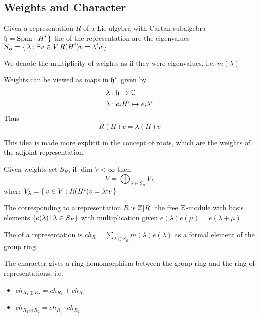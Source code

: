 \documentclass{article}
\begin{document}
\subsection{Weights and Character}
\begin{definition}[Weights]
	Given a representation $R$ of a Lie algebra with Cartan subalgebra $\mathfrak{h}=\operatorname{Span}\set{ H^i }$ the  of the representation are the eigenvalues $S_R=\set{ \lambda : \exists v\in V \, R(H^i)v=\lambda^i v}$
\end{definition}

\begin{notation}
	We denote the multiplicity of weights as if they were eigenvalues, i.e. $m(\lambda)$
\end{notation}

\begin{fact}
	Weights can be viewed as maps in $\mathfrak{h}^\ast$ given by 
	\begin{align*}
		\lambda &:\mathfrak{h}\to\mathbb{C} \\
		\lambda &: e_i H^i \mapsto e_i \lambda^i
	\end{align*}
	Thus 
	\[
	R(H)v=\lambda(H)v
	\]
\end{fact}

\begin{idea}
	This idea is made more explicit in the concept of roots, which are the weights of the adjoint representation. 
\end{idea}

\begin{fact}
	Given weights set $S_R$, if $\dim V < \infty$ then 
	\[
	V=\bigoplus_{\lambda\in S_R} V_\lambda
	\]
	where $V_\lambda=\set{ v\in V : R(H^i)v=\lambda^i v}$
\end{fact}


\begin{definition}
	The  corresponding to a representation $R$ is $\mathbb{Z}[R]$ the free $\mathbb{Z}$-module with basis elements $\left\{ e(\lambda) \, | \, \lambda \in S_R \right\}$ with multiplication given $e(\lambda)e(\mu) = e(\lambda + \mu)$.  
\end{definition}

\begin{definition}
	The  of a representation is $ch_R = \sum_{\lambda \in S_R} m(\lambda) e(\lambda)$ as a formal element of the group ring. 
\end{definition}

\begin{prop}
	The character gives a ring homomorphism between the group ring and the ring of representations, i.e. 
	\begin{itemize}
		\item $ch_{R_1 \oplus R_2} = ch_{R_1} + ch_{R_2}$ 
		\item $ch_{R_1 \otimes R_2} = ch_{R_1} \cdot ch_{R_2}$
	\end{itemize}
\end{prop}
\end{document}
